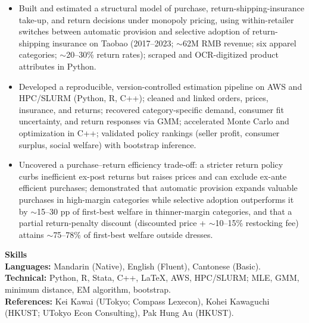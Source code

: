 \documentclass[11pt,letterpaper]{article}
\begin{document}
\begin{itemize}
  \item Built and estimated a structural model of purchase, return-shipping-insurance take-up, and return decisions under monopoly pricing, using within-retailer switches between automatic provision and selective adoption of return-shipping insurance on Taobao (2017--2023; \(\sim\)62M RMB revenue; six apparel categories; \(\sim\)20--30\% return rates); scraped and OCR-digitized product attributes in Python.
  \item Developed a reproducible, version-controlled estimation pipeline on AWS and HPC/SLURM (Python, R, C++); cleaned and linked orders, prices, insurance, and returns; recovered category-specific demand, consumer fit uncertainty, and return responses via GMM; accelerated Monte Carlo and optimization in C++; validated policy rankings (seller profit, consumer surplus, social welfare) with bootstrap inference.
  \item Uncovered a purchase--return efficiency trade-off: a stricter return policy curbs inefficient ex-post returns but raises prices and can exclude ex-ante efficient purchases; demonstrated that automatic provision expands valuable purchases in high-margin categories while selective adoption outperforms it by \(\sim\)15--30 pp of first-best welfare in thinner-margin categories, and that a partial return-penalty discount (discounted price + \(\sim\)10--15\% restocking fee) attains \(\sim\)75--78\% of first-best welfare outside dresses.
\end{itemize}

\vspace{0.15pt}

{\large \textbf{Skills}}\\[-0.5pt]
\textbf{Languages:} Mandarin (Native), English (Fluent), Cantonese (Basic).\\
\textbf{Technical:} Python, R, Stata, C++, \LaTeX, AWS, HPC/SLURM; MLE, GMM, minimum distance, EM algorithm, bootstrap.\\
\textbf{References:} Kei Kawai (UTokyo; Compass Lexecon), Kohei Kawaguchi (HKUST; UTokyo Econ Consulting), Pak Hung Au (HKUST).
\end{document}
